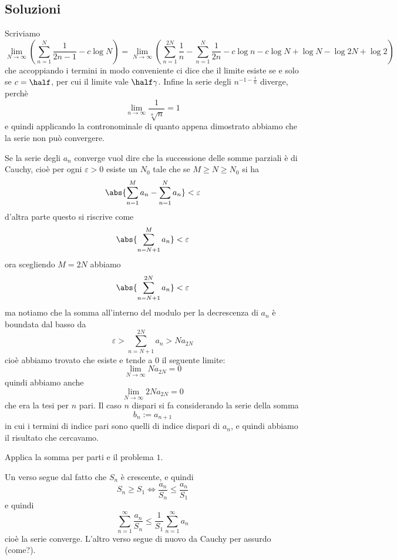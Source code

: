 \documentclass[11pt]{scrartcl}
\begin{document}
	\subsection{Soluzioni}
	\begin{answer}[Problema 1]
		Scriviamo 
		$$\lim_{N\to\infty}\left(\sum_{n=1}^N \frac{1}{2n-1}-c\log N \right)=\lim_{N\to\infty}\left(\sum_{n=1}^{2N}\frac{1}{n}-\sum_{n=1}^N \frac{1}{2n}-c\log n -c\log N + \log N -\log 2N + \log 2\right)$$
		che accoppiando i termini in modo conveniente ci dice che il limite esiste se e solo se $c=\half$, per cui il limite vale $\half \gamma$. Infine la serie degli $n^{-1-\frac{1}{n}}$ diverge, perchè
		$$\lim_{n\to\infty}\frac{1}{\sqrt[n]{n}}=1$$ 
		e quindi applicando la contronominale di quanto appena dimostrato abbiamo che la serie non può convergere.
	\end{answer}
	\begin{answer}[Problema 2]
		Se la serie degli $a_n$ converge vuol dire che la successione delle somme parziali è di Cauchy, cioè per ogni $\varepsilon>0$ esiste un $N_0$ tale che se $M\ge N\ge N_0$ si ha
		$$\abs{\sum_{n=1}^Ma_n-\sum_{n=1}^Na_n}<\varepsilon$$
		d'altra parte questo si riscrive come
		$$\abs{\sum_{n=N+1}^M a_n}<\varepsilon$$
		ora scegliendo $M=2N$ abbiamo
		$$\abs{\sum_{n=N+1}^{2N}a_n}<\varepsilon$$
		ma notiamo che la somma all'interno del modulo per la decrescenza di $a_n$ è boundata dal basso da
		$$\varepsilon>\sum_{n=N+1}^{2N}a_n>Na_{2N}$$
		cioè abbiamo trovato che esiste e tende a $0$ il seguente limite:
		$$\lim_{N\to\infty}Na_{2N}=0$$
		quindi abbiamo anche
		$$\lim_{N\to\infty}2Na_{2N}=0$$
		che era la tesi per $n$ pari. Il caso $n$ dispari si fa considerando la serie della somma
		$$b_n:=a_{n+1}$$
		in cui i termini di indice pari sono quelli di indice dispari di $a_n$, e quindi abbiamo il risultato che cercavamo.
	\end{answer}
	\begin{answer}[Problema 3]
		Applica la somma per parti e il problema $1$.
	\end{answer}
	\begin{answer}[Problema 4]
		Un verso segue dal fatto che $S_n$ è crescente, e quindi 
		$$S_n\ge S_1 \iff \frac{a_n}{S_n}\le \frac{a_n}{S_1}$$
		e quindi 
		$$\sum_{n=1}^\infty \frac{a_n}{S_n}\le \frac{1}{S_1}\sum_{n=1}^\infty a_n$$
		cioè la serie converge. L'altro verso segue di nuovo da Cauchy per assurdo (come?). 
	\end{answer}
	
	\newpage
	
\end{document}
